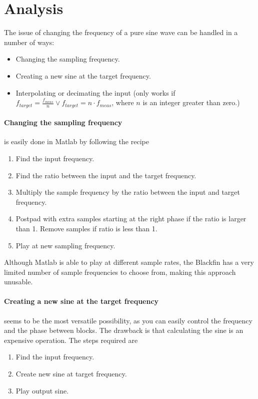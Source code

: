 
\section{Analysis}
\label{sec:simpleanal}
The issue of changing the frequency of a pure sine wave can be handled in a number of ways:
\begin{itemize}
	\item Changing the sampling frequency.
	\item Creating a new sine at the target frequency.
	\item Interpolating or decimating the input (only works if $f_{target}=\frac{f_{meas}}{n}\vee f_{target} =n\cdot f_{meas}$, where $n$ is an integer greater than zero.)
\end{itemize}

\paragraph{Changing the sampling frequency} is easily done in Matlab by following the recipe
\begin{enumerate}
	\item Find the input frequency.
	\item Find the ratio between the input and the target frequency.
	\item Multiply the sample frequency by the ratio between the input and target frequency.
	\item Postpad with extra samples starting at the right phase if the ratio is larger than 1. Remove samples if ratio is less than 1.
	\item Play at new sampling frequency.
\end{enumerate}
Although Matlab is able to play at different sample rates, the Blackfin has a very limited number of sample frequencies to choose from, making this approach unusable\cite[p.~19]{AD1836A}.

\paragraph{Creating a new sine at the target frequency} seems to be the most versatile possibility, as you can easily control the frequency and the phase between blocks. The drawback is that calculating the sine is an expensive operation. The steps required are
\begin{enumerate}
	\item Find the input frequency.
	\item Create new sine at target frequency.
	\item Play output sine.
\end{enumerate}

